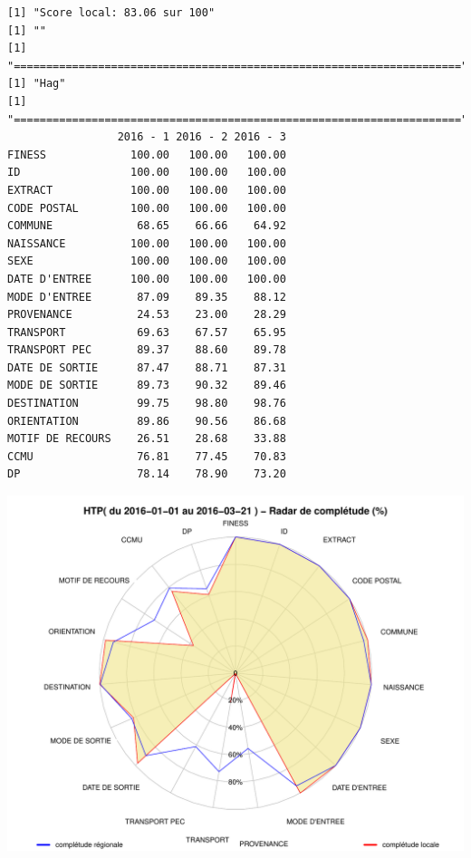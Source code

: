 \documentclass[]{article}
\begin{document}
\begin{verbatim}
[1] "Score local: 83.06 sur 100"
[1] ""
[1] "====================================================================="
[1] "Hag"
[1] "====================================================================="
                 2016 - 1 2016 - 2 2016 - 3
FINESS             100.00   100.00   100.00
ID                 100.00   100.00   100.00
EXTRACT            100.00   100.00   100.00
CODE POSTAL        100.00   100.00   100.00
COMMUNE             68.65    66.66    64.92
NAISSANCE          100.00   100.00   100.00
SEXE               100.00   100.00   100.00
DATE D'ENTREE      100.00   100.00   100.00
MODE D'ENTREE       87.09    89.35    88.12
PROVENANCE          24.53    23.00    28.29
TRANSPORT           69.63    67.57    65.95
TRANSPORT PEC       89.37    88.60    89.78
DATE DE SORTIE      87.47    88.71    87.31
MODE DE SORTIE      89.73    90.32    89.46
DESTINATION         99.75    98.80    98.76
ORIENTATION         89.86    90.56    86.68
MOTIF DE RECOURS    26.51    28.68    33.88
CCMU                76.81    77.45    70.83
DP                  78.14    78.90    73.20
\end{verbatim}

\includegraphics{completude_files/figure-latex/finess-2.pdf}
\end{document}

